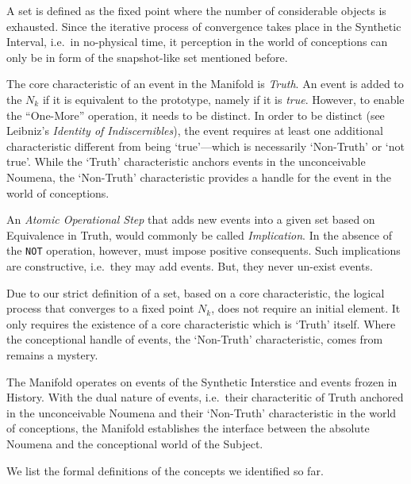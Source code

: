 \documentclass[11pt, a4paper]{article}
\theoremstyle{formalism}
\begin{document}
A set is defined as the fixed point where the number of considerable objects is
exhausted. Since the iterative process of convergence takes place in the
Synthetic Interval, i.e.\ in no-physical time, it perception in the world 
of conceptions can only be in form of the snapshot-like set mentioned before.

The core characteristic of an event in the Manifold is {\it Truth}. An event is
added to the $N_k$ if it is equivalent to the prototype, namely if it is {\it
true}. However, to enable the ``One-More'' operation, it needs to be distinct.
In order to be distinct (see Leibniz's \textit{Identity of Indiscernibles}),
the event requires at least one additional characteristic different from being
`true'---which is necessarily `Non-Truth' or `not true'. While the `Truth'
characteristic anchors events in the unconceivable Noumena, the `Non-Truth'
characteristic provides a handle for the event in the world of conceptions.

An {\it Atomic Operational Step\/} that adds new events into a given set based
on Equivalence in Truth, would commonly be called {\it Implication}. In the
absence of the {\tt NOT} operation, however, must impose positive consequents. Such
implications are constructive, i.e.\ they may add events. But,
they never un-exist events.

Due to our strict definition of a set, based on a core characteristic, the
logical process that converges to a fixed point $N_k$, does not require an
initial element. It only requires the existence of a core
characteristic which is `Truth' itself. Where the conceptional handle of
events, the `Non-Truth' characteristic, comes from remains a mystery.

The Manifold operates on events of the Synthetic Interstice and events frozen
in History. With the dual nature of events, i.e.\ their characteritic of Truth
anchored in the unconceivable Noumena and their `Non-Truth' characteristic in
the world of conceptions, the Manifold establishes the interface between the
absolute Noumena and the conceptional world of the Subject.

We list the formal definitions of the concepts we identified so far.
\end{document}
